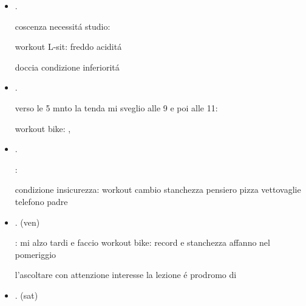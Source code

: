 \begin{itemize}
workout senza determinazione senza coscenza obiettivo

preoccupazione incontro scontro necessario, devo essere preparato: come trASFORMARE I DELIRI in possibilit\'a concrete?

a mensa ascolto i discorsi di chi mi \'e vicino commentando o stando attento: a quale condizione mi inchiodo?


\item {}.


coscenza necessit\'a studio: 

workout L-sit: freddo acidit\'a

doccia condizione inferiorit\'a

\item {}.

verso le 5 mnto la tenda mi sveglio alle 9 e poi alle 11: 

workout bike: , 

\item {}.



: 


condizione insicurezza: workout cambio stanchezza pensiero pizza vettovaglie telefono padre 

\item {}.
(ven)

: mi alzo tardi e faccio workout bike: record e stanchezza affanno nel pomeriggio

l'ascoltare con attenzione interesse la lezione \'e prodromo di 


\item {}.
(sat)



\end{itemize}
